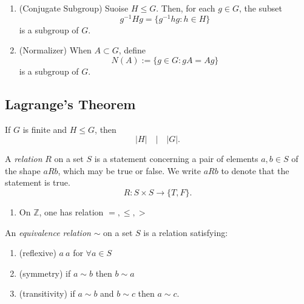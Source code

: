 
\begin{enumerate}[resume]
	\item (Conjugate Subgroup) Suoise $H\le G$. Then, for each $g \in G$, the subset \[
		g^{-1} H g = \{g^{-1} hg: h \in H\} 
	\] 
	is a subgroup of $G$.
\item (Normalizer) When $A \subset G$, define \[
	N(A) := \{g \in G: g A = A g\} 
\] 
	is a subgroup of $G$.
\end{enumerate}

\subsection{Lagrange's Theorem}

\begin{theorem}
	If $G$ is finite and $H \le G$, then \[
		|H| \quad\big| \quad|G|
	.\] 
\end{theorem}

\begin{definition}
	A \textit{relation} $R$ on a set $S $ is a statement concerning a pair of elements $a,b \in S$ of the shape $aRb$, which may be true or false. We write $aRb$ to denote that the statement is true.
	\[
		R: S \times S \to  \{T,F\} 
	.\] 
\end{definition}

\begin{example}
	 \begin{enumerate}
		\item On $\mathbb{Z}$, one has relation $=, \le , >$
	\end{enumerate}
\end{example}

\begin{definition}
	An \textit{equivalence relation} $\sim $ on a set $S$ is a relation satisfying:
	\begin{enumerate}
		\item (reflexive) $a ~ a$ for $\forall a \in S$
		\item (symmetry) if $a\sim b$ then $b\sim a$ 
		\item (transitivity) if $a\sim b$ and $b\sim c$ then $a \sim c$.
	\end{enumerate}
\end{definition}

